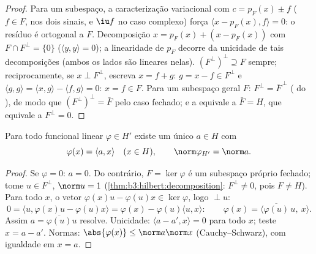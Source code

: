 \begin{proof}
Para um subespaço, a caracterização variacional com $c =
p_F(x) \pm f$ ($f \in F$, nos dois
sinais, e $\iu f$ no caso complexo) força $\langle x - p_F(x), f\rangle = 0$: o resíduo é ortogonal
a $F$. Decomposição $x = p_F(x) + (x
- p_F(x))$ com $F \cap F^\perp = \{0\}$ ($\langle y, y
\rangle = 0$); a linearidade de $p_F$
decorre da unicidade de tais decomposições (ambos os lados são lineares
nelas). $(F^\perp)
^\perp \supseteq F$ sempre; reciprocamente, se $x \perp F^\perp$, escreva $x = f + g$: $g = x - f \in F^\perp$ e
$\langle g,
g\rangle = \langle x, g\rangle - \langle f, g\rangle = 0$: $x
= f \in F$. Para um subespaço geral $F$: $F^\perp = \bar
F^{\,\perp}$ ( do
), de modo que $(F^\perp)^\perp = \bar F$ pelo caso fechado; e a 
equivale a $\bar F = H$, que equivale a $F^\perp = 0$.
\end{proof}

\begin{theorem}\label{thm:b3:hilbert:riesz}
Para todo funcional linear  $\varphi \in H'$ existe um único $a \in H$
com
\[
\varphi(x) = \langle a, x\rangle \quad (x \in H),
\qquad \norm\varphi_{H'} = \norm a .
\]
\end{theorem}

\begin{proof}
Se $\varphi = 0$: $a = 0$. Do contrário, $F = \ker\varphi$ é um subespaço próprio fechado;
tome $u \in F^\perp$, $\norm u = 1$ (\cref{thm:b3:hilbert:decomposition}: $F^\perp \neq 0$, pois $F \neq H$). Para todo $x$, o
vetor $\varphi(x)u -
\varphi(u)x \in \ker\varphi$, logo $\perp u$:
\[
0 = \langle u, \varphi(x)u - \varphi(u)x\rangle
= \varphi(x) - \varphi(u)\langle u, x\rangle :
\qquad \varphi(x) = \langle
\overline{\varphi(u)}\,u,\ x\rangle .
\]
Assim $a = \overline{\varphi(u)}u$ resolve. Unicidade: $\langle a
- a', x\rangle = 0$ para todo $x$; teste $x = a - a'$.
Normas: $\abs{\varphi(x)} \leq \norm a\norm x$ (Cauchy--Schwarz), com igualdade em $x = a$.
\end{proof}

